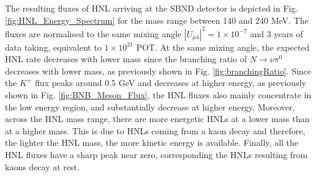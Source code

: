 The resulting fluxes of HNL arriving at the SBND detector is depicted in Fig. \ref{fig:HNL_Energy_Spectrum} for the mass range between 140 and 240 MeV.
The fluxes are normalised to the same mixing angle $|U_{\mu4}|^{2} = 1 \times 10^{-7}$ and 3 years of data taking, equivalent to $1 \times 10^{21}$ POT.
At the same mixing angle, the expected HNL rate decreases with lower mass since the branching  ratio of $N \rightarrow \nu\pi^0$ decreases with lower mass, as previously shown in Fig. \ref{fig:branchingRatio}.
Since the $K^{+}$ flux peaks around 0.5 GeV and decreases at higher energy, as previously shown in Fig. \ref{fig:BNB_Meson_Flux}, the HNL fluxes also mainly concentrate in the low energy region, and substantially decrease at higher energy. 
Moreover, across the HNL mass range, there are more energetic HNLs at a lower mass than at a higher mass.
This is due to HNLs coming from a kaon decay and therefore, the lighter the HNL mass, the more kinetic energy is available.
Finally, all the HNL fluxes have a sharp peak near zero, corresponding the HNLs resulting from kaons decay at rest.

